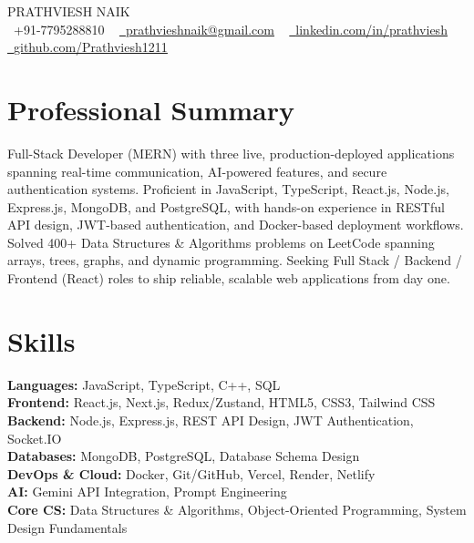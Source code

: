 \documentclass[letterpaper,11pt]{article}
\begin{document}
%
%

\begin{center}
    {\Huge \scshape PRATHVIESH NAIK} \\ \vspace{4pt}
    \small \faPhone\ +91-7795288810 ~ 
    \href{mailto:prathvieshnaik@gmail.com}{\faEnvelope\ \underline{prathvieshnaik@gmail.com}} ~ 
    \href{https://www.linkedin.com/in/prathviesh1211/}{\faLinkedin\ \underline{linkedin.com/in/prathviesh}} ~
    \href{https://github.com/Prathviesh1211/}{\faGithub\ \underline{github.com/Prathviesh1211}}
 
\end{center}

\section{Professional Summary}
Full-Stack Developer (MERN) with three live, production-deployed applications spanning real-time communication, AI-powered features, and secure authentication systems. Proficient in JavaScript, TypeScript, React.js, Node.js, Express.js, MongoDB, and PostgreSQL, with hands-on experience in RESTful API design, JWT-based authentication, and Docker-based deployment workflows. Solved 400+ Data Structures \& Algorithms problems on LeetCode spanning arrays, trees, graphs, and dynamic programming. Seeking Full Stack / Backend / Frontend (React) roles to ship reliable, scalable web applications from day one.

\section{Skills}

\textbf{Languages:} JavaScript, TypeScript, C++, SQL \\
\textbf{Frontend:} React.js, Next.js, Redux/Zustand, HTML5, CSS3, Tailwind CSS \\
\textbf{Backend:} Node.js, Express.js, REST API Design, JWT Authentication, Socket.IO \\
\textbf{Databases:} MongoDB, PostgreSQL, Database Schema Design \\
\textbf{DevOps \& Cloud:} Docker, Git/GitHub, Vercel, Render, Netlify \\
\textbf{AI:} Gemini API Integration, Prompt Engineering\\
\textbf{Core CS:} Data Structures \& Algorithms, Object-Oriented Programming, System Design Fundamentals \\
\end{document}
